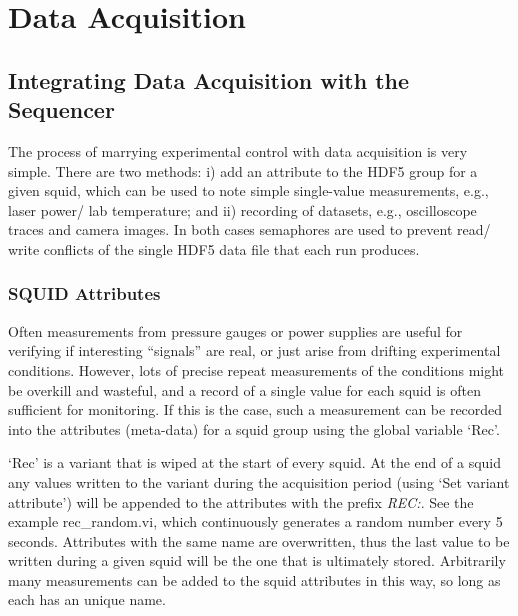 \documentclass[10pt,a4paper]{article}
\begin{document}
\section{Data Acquisition}
\subsection{Integrating Data Acquisition with the Sequencer}
The process of marrying experimental control with data acquisition is very simple.  There are two methods: i) add an attribute to the HDF5 group for a given squid, which can be used to note simple single-value measurements, e.g., laser power/ lab temperature; and ii) recording of datasets, e.g., oscilloscope traces and camera images.  In both cases semaphores are used to prevent read/ write conflicts of the single HDF5 data file that each run produces.

\subsubsection{SQUID Attributes}
Often measurements from pressure gauges or power supplies are useful for verifying if interesting ``signals'' are real, or just arise from drifting experimental conditions.  However, lots of precise repeat measurements of the conditions might be overkill and wasteful, and a record of a single value for each squid is often sufficient for monitoring.  If this is the case, such a measurement can be recorded into the attributes (meta-data) for a squid group using the global variable `Rec'.

`Rec' is a variant that is wiped at the start of every squid.  At the end of a squid any values written to the variant during the acquisition period (using `Set variant attribute') will be appended to the attributes with the prefix \emph{REC:}.  See the example rec\_random.vi, which continuously generates a random number every 5 seconds.  Attributes with the same name are overwritten, thus the last value to be written during a given squid will be the one that is ultimately stored. Arbitrarily  many measurements can be added to the squid attributes in this way, so long as each has an unique name.
\end{document}
